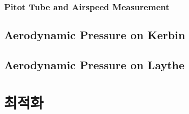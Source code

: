 \subsection{Pitot Tube and Airspeed Measurement}
\section{Aerodynamic Pressure on Kerbin}
\section{Aerodynamic Pressure on Laythe}
\chapter{최적화}